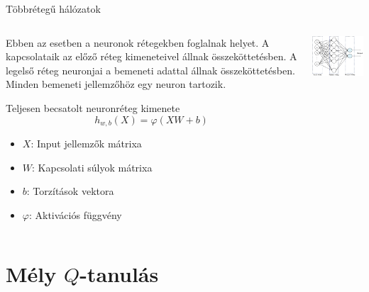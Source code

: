 \documentclass[english, aspectratio=169]{beamer}
\makeatletter
\let\origtableofcontents=\tableofcontents
\def\tableofcontents{\@ifnextchar[{\origtableofcontents}{\gobbletableofcontents}}
\def\gobbletableofcontents#1{\origtableofcontents}
\makeatother
\begin{document}
\begin{frame}{Többrétegű hálózatok}
\begin{columns}
\begin{column}{.5\textwidth}
Ebben az esetben a neuronok rétegekben foglalnak helyet. A kapcsolataik az előző réteg kimeneteivel állnak összeköttetésben. A legelső réteg neuronjai a bemeneti adattal állnak összeköttetésben. Minden bemeneti jellemzőhöz egy neuron tartozik.\par\smallskip
\begin{block}{Teljesen becsatolt neuronréteg kimenete}
\[
h_{w,b}(X)=\varphi(XW+b)
\]
\vspace{-0.5cm}
\begin{itemize}
	\item $X$: Input jellemzők mátrixa
	\item $W$: Kapcsolati súlyok mátrixa
	\item $b$: Torzítások vektora
	\item $\varphi$: Aktivációs függvény
\end{itemize}
\end{block}
\end{column}
\begin{column}{.5\textwidth}
\begin{center}
\includegraphics[width=7cm, keepaspectratio]{images/ql_22.png}
\end{center}
\end{column}
\end{columns}
\end{frame}

\section{Mély $Q$-tanulás}

\begin{frame}
\tableofcontents[currentsection]
\end{frame}
\end{document}
